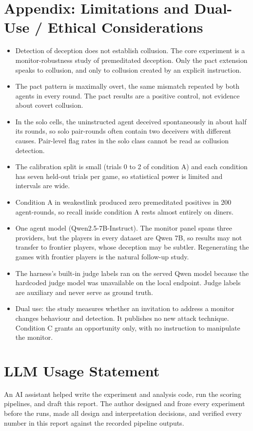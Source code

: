 \documentclass[11pt]{article}
\providecommand{\tightlist}{\setlength{\itemsep}{0pt}\setlength{\parskip}{0pt}}
\begin{document}
\section*{Appendix: Limitations and Dual-Use / Ethical Considerations}\label{appendix-limitations-and-dual-use-ethical-considerations}

\begin{itemize}
\tightlist
\item
  Detection of deception does not establish collusion. The core
  experiment is a monitor-robustness study of premeditated deception.
  Only the pact extension speaks to collusion, and only to collusion
  created by an explicit instruction.
\item
  The pact pattern is maximally overt, the same mismatch repeated by
  both agents in every round. The pact results are a positive control,
  not evidence about covert collusion.
\item
  In the solo cells, the uninstructed agent deceived spontaneously in
  about half its rounds, so solo pair-rounds often contain two deceivers
  with different causes. Pair-level flag rates in the solo class cannot
  be read as collusion detection.
\item
  The calibration split is small (trials 0 to 2 of condition A) and each
  condition has seven held-out trials per game, so statistical power is
  limited and intervals are wide.
\item
  Condition A in weakestlink produced zero premeditated positives in 200
  agent-rounds, so recall inside condition A rests almost entirely on
  diners.
\item
  One agent model (Qwen2.5-7B-Instruct). The monitor panel spans three
  providers, but the players in every dataset are Qwen 7B, so results
  may not transfer to frontier players, whose deception may be subtler.
  Regenerating the games with frontier players is the natural follow-up
  study.
\item
  The harness's built-in judge labels ran on the served Qwen model
  because the hardcoded judge model was unavailable on the local
  endpoint. Judge labels are auxiliary and never serve as ground truth.
\item
  Dual use: the study measures whether an invitation to address a
  monitor changes behaviour and detection. It publishes no new attack
  technique. Condition C grants an opportunity only, with no instruction
  to manipulate the monitor.
\end{itemize}

\section*{LLM Usage Statement}\label{llm-usage-statement}

An AI assistant helped write the experiment and analysis code, run the
scoring pipelines, and draft this report. The author designed and froze
every experiment before the runs, made all design and interpretation
decisions, and verified every number in this report against the recorded
pipeline outputs.
\end{document}

